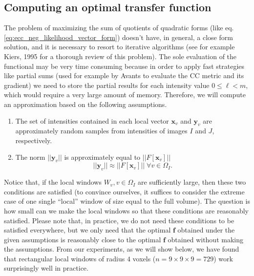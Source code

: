 \subsection{Computing an optimal transfer function}
The problem of maximizing the sum of quotients of quadratic forms (like eq. \eqref{eq:ecc_neg_likelihood_vector_form}) doesn't have, in general, a close form solution, and it is necessary to resort to iterative algorithms (see for example Kiers, 1995 \cite{Kiers1995} for a thorough review of this problem). The sole evaluation of the functional may be very time consuming because in order to apply fast strategies like partial sums (used for example by Avants \cite{Avants2008} to evaluate the CC metric and its gradient) we need to store the partial results for each intensity value $0 \leq \ell < m$, which would require a very large amount of memory. Therefore, we will compute an approximation based on the following assumptions.\\

\begin{enumerate}
    \item The set of intensities contained in each local vector $\mathbf{x}_{v}$ and $\mathbf{y}_{v}$ are approximately random samples from intensities of images $I$ and $J$, respectively.\\
    \item The norm $||\mathbf{y}_{v}||$ is approximately equal to $||F[\mathbf{x}_{v}]||$
            \begin{equation*}
                ||\mathbf{y}_{v}|| \approx ||F[\mathbf{x}_{v}]|| \; \forall v\in\Omega_{I}.
            \end{equation*}
\end{enumerate}

Notice that, if the local windows $W_{v}, v\in\Omega_{I}$ are sufficiently large, then these two conditions are satisfied (to convince ourselves, it suffices to consider the extreme case of one single ``local'' window of size equal to the full volume). The question is how small can we make the local windows so that these conditions are reasonably satisfied. Please note that, in practice, we do not need these conditions to be satisfied everywhere, but we only need that the optimal $\mathbf{f}$ obtained under the given assumptions is reasonably close to the optimal $\mathbf{f}$ obtained without making the assumptions. From our experiments, as we will show below, we have found that rectangular local windows of radius $4$ voxels ($n=9\times 9\times 9 = 729$) work surprisingly well in practice.\\

